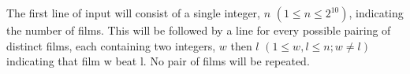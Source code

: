 The first line of input will consist of a single integer, $n$ $(1 \le n \le 2^{10})$, indicating
the number of films. This will be followed by a line for every possible pairing of
distinct films, each containing two integers, $w$ then $l$ $(1 \le w, l \le n; w ≠ l)$
indicating that film w beat l. No pair of films will be repeated.
